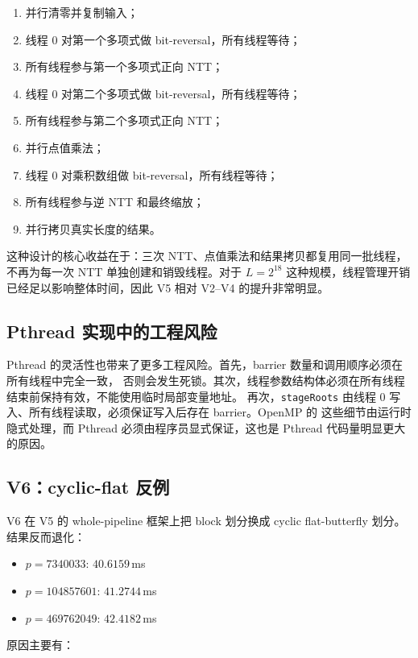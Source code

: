 \documentclass[UTF8,a4paper,10pt]{ctexart}
\begin{document}
\begin{enumerate}
  \item 并行清零并复制输入；
  \item 线程 0 对第一个多项式做 bit-reversal，所有线程等待；
  \item 所有线程参与第一个多项式正向 NTT；
  \item 线程 0 对第二个多项式做 bit-reversal，所有线程等待；
  \item 所有线程参与第二个多项式正向 NTT；
  \item 并行点值乘法；
  \item 线程 0 对乘积数组做 bit-reversal，所有线程等待；
  \item 所有线程参与逆 NTT 和最终缩放；
  \item 并行拷贝真实长度的结果。
\end{enumerate}

这种设计的核心收益在于：三次 NTT、点值乘法和结果拷贝都复用同一批线程，不再为每一次 NTT
单独创建和销毁线程。对于 $L=2^{18}$ 这种规模，线程管理开销已经足以影响整体时间，因此 V5
相对 V2--V4 的提升非常明显。

\subsection{Pthread 实现中的工程风险}

Pthread 的灵活性也带来了更多工程风险。首先，barrier 数量和调用顺序必须在所有线程中完全一致，
否则会发生死锁。其次，线程参数结构体必须在所有线程结束前保持有效，不能使用临时局部变量地址。
再次，\texttt{stageRoots} 由线程 0 写入、所有线程读取，必须保证写入后存在 barrier。OpenMP 的
这些细节由运行时隐式处理，而 Pthread 必须由程序员显式保证，这也是 Pthread 代码量明显更大的原因。

\subsection{V6：cyclic-flat 反例}

V6 在 V5 的 whole-pipeline 框架上把 block 划分换成 cyclic flat-butterfly 划分。结果反而退化：

\begin{itemize}
  \item $p = 7340033$: $40.6159$\,ms
  \item $p = 104857601$: $41.2744$\,ms
  \item $p = 469762049$: $42.4182$\,ms
\end{itemize}

原因主要有：
\end{document}
